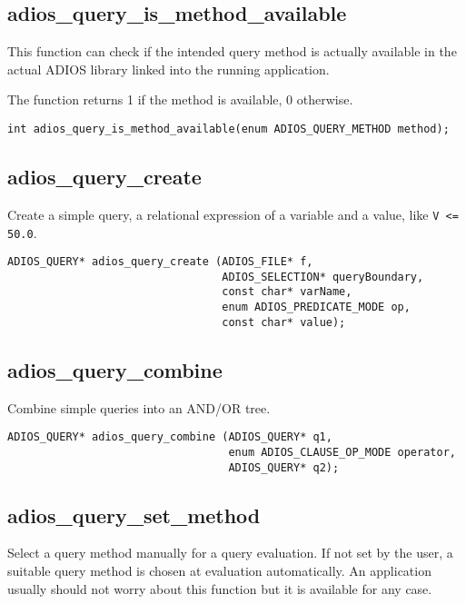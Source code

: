 \subsection{adios\_query\_is\_method\_available}
This function can check if the intended query method is actually available in the actual ADIOS library linked into the running application. 

\noindent The function returns 1 if the method is available, 0 otherwise.

\begin{lstlisting}[alsolanguage=C]
int adios_query_is_method_available(enum ADIOS_QUERY_METHOD method);
\end{lstlisting}

\subsection{adios\_query\_create}
Create a simple query, a relational expression of a variable and a value, like \verb+V <= 50.0+. 

\begin{lstlisting}[alsolanguage=C]
ADIOS_QUERY* adios_query_create (ADIOS_FILE* f,
                                 ADIOS_SELECTION* queryBoundary,
                                 const char* varName,
                                 enum ADIOS_PREDICATE_MODE op,
                                 const char* value);
\end{lstlisting}

\subsection{adios\_query\_combine}
Combine simple queries into an AND/OR tree. 

\begin{lstlisting}[alsolanguage=C]
ADIOS_QUERY* adios_query_combine (ADIOS_QUERY* q1,
                                  enum ADIOS_CLAUSE_OP_MODE operator,
                                  ADIOS_QUERY* q2);
\end{lstlisting}

\subsection{adios\_query\_set\_method}
Select a query method manually for a query evaluation. If not set by the user, a suitable query method is chosen at evaluation automatically. An application usually should not worry about this function but it is available for any case. 

